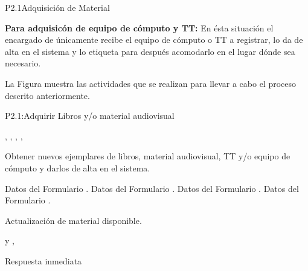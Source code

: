 \begin{Proceso}{P2.1}{Adquisición de Material}
{\textbf{Para adquisicón de equipo de cómputo y TT:} En ésta situación el encargado de  únicamente recibe el equipo de cómputo o TT a registrar, lo da de alta en el sistema y lo etiqueta para después acomodarlo en el lugar dónde sea necesario.

\newpage
  \noindent La Figura  muestra las actividades que se realizan para llevar a cabo el proceso descrito anteriormente.


} {P2.1:Adquirir Libros y/o material audiovisual}



    { %
	,
	 ,
	,
	,
  }

   { %
    Obtener nuevos ejemplares de libros, material audiovisual, TT y/o equipo de cómputo y darlos de alta en el sistema.
  }

   { %
  	\begin{UClist}
  		\UCli Datos del Formulario . 
  		\UCli Datos del Formulario .
		\UCli Datos del Formulario .
		\UCli Datos del Formulario . 
     	
    \end {UClist}
  }
  
   { %
  }

   { %
    \begin{UClist}
		\UCli	Actualización de material disponible.
    \end{UClist}
  }

   { %
     y
	,
  }

   { %
    \begin{UClist}
      \UCli Respuesta inmediata
    \end{UClist}
  }
   { %
  }


\end{Proceso}
